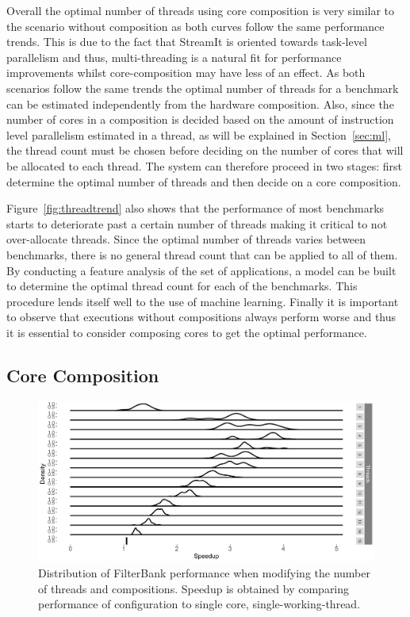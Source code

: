 Overall the optimal number of threads using core composition is very similar to the scenario without composition as both curves follow the same performance trends.
This is due to the fact that StreamIt is oriented towards task-level parallelism and thus, multi-threading is a natural fit for performance improvements whilst core-composition may have less of an effect.
As both scenarios follow the same trends the optimal number of threads for a benchmark can be estimated independently from the hardware composition.
Also, since the number of cores in a composition is decided based on the amount of instruction level parallelism estimated in a thread, as will be explained in Section~\ref{sec:ml}, the thread count must be chosen before deciding on the number of cores that will be allocated to each thread.
The system can therefore proceed in two stages: first determine the optimal number of threads and then decide on a core composition.

Figure~\ref{fig:threadtrend} also shows that the performance of most benchmarks starts to deteriorate past a certain number of threads making it critical to not over-allocate threads.
Since the optimal number of threads varies between benchmarks, there is no general thread count that can be applied to all of them.
By conducting a feature analysis of the set of applications, a model can be built to determine the optimal thread count for each of the benchmarks.
This procedure lends itself well to the use of machine learning.
Finally it is important to observe that executions without compositions always perform worse and thus it is essential to consider composing cores to get the optimal performance.


\subsection{Core Composition}

\begin{figure}[t]
  \includegraphics[width=1\textwidth]{streamit-paper/graphics/filterbank_tot2.pdf}
  \caption{Distribution of FilterBank performance when modifying the number of threads and compositions. Speedup is obtained by comparing performance of configuration to single core, single-working-thread.}\label{fig:fbtotal}
\end{figure}

